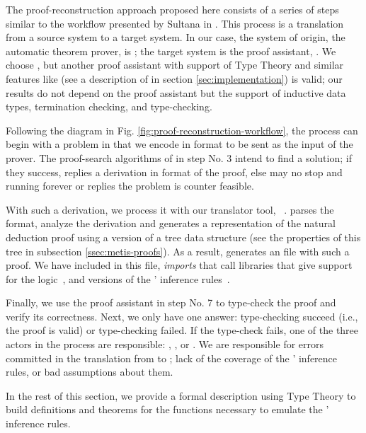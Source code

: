 \documentclass[../main.tex]{subfiles}
\begin{document}
The proof-reconstruction approach proposed here consists of a series
of steps similar to the workflow presented by Sultana in
\cite{sultana2015}. This process is a translation from a source
system to a target system. In our case, the system of origin, the
automatic theorem prover, is \Metis; the target system is the proof
assistant, \Agda. We choose \Agda, but another proof assistant with
support of Type Theory and similar features like \Agda
(see a description of \Agda in section
\ref{sec:implementation}) is valid; our results do not depend on
the proof assistant but the support of inductive data types,
termination checking, and type-checking.

Following the diagram in Fig.
\ref{fig:proof-reconstruction-workflow}, the process can begin with
a problem in \CPL that we encode in \TPTP format to be sent as the
input of the \Metis prover.
The proof-search algorithms of \Metis in step No. 3 intend to find
a solution; if they success, \Metis replies a derivation in \TSTP
format of the proof, else \Metis may no stop and running forever or
replies the problem is counter feasible.

With such a derivation, we process it with our \Haskell translator
tool, \Athena~\cite{Athena}.
\Athena parses the \TSTP format, analyze the
derivation and generates a representation of the natural deduction
proof using a version of a tree data structure (see the properties
of this tree in subsection \ref{ssec:metis-proofs}). As a result,
\Athena generates an \Agda file with such a proof. We have included
in this file, \emph{imports} that call \Agda libraries that give
support for the logic~\cite{AgdaProp}, and versions of the \Metis'
inference rules~\cite{AgdaMetis}.

Finally, we use the proof assistant in step No. 7 to type-check the
proof and verify its correctness. Next, we only have one answer:
type-checking succeed (i.e., the proof is valid) or type-checking
failed.
If the type-check fails, one of the three actors in the process are
responsible: \Metis, \Athena, or \Agda. We are responsible for
errors committed in the translation from \TSTP to \Agda; lack of the
coverage of the \Metis' inference rules, or bad assumptions about
them. 

In the rest of this section, we provide a formal description using
Type Theory to build definitions and theorems for the functions
necessary to emulate the \Metis' inference rules.

\end{document}
